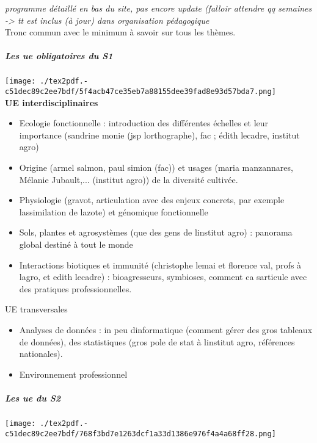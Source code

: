 \documentclass[
]{article}
\providecommand{\tightlist}{%
  \setlength{\itemsep}{0pt}\setlength{\parskip}{0pt}}
\begin{document}
\emph{programme détaillé en bas du site, pas encore update (falloir
attendre qq semaines -\textgreater{} tt est inclus (à jour) dans
organisation pédagogique}\\
Tronc commun avec le minimum à savoir sur tous les thèmes.

\hypertarget{les-ue-obligatoires-du-s1}{%
\subparagraph{Les ue obligatoires du
S1}\label{les-ue-obligatoires-du-s1}}

\texttt{[image: ./tex2pdf.-c51dec89c2ee7bdf/5f4acb47ce35eb7a88155dee39fad8e93d57bda7.png]}\\
\textbf{UE interdisciplinaires}

\begin{itemize}
\tightlist
\item
  Ecologie fonctionnelle : introduction des différentes échelles et leur
  importance (sandrine monie (jsp l\textquotesingle orthographe), fac ;
  édith lecadre, institut agro)
\item
  Origine (armel salmon, paul simion (fac)) et usages (maria
  manzannares, Mélanie Jubault,... (institut agro)) de la diversité
  cultivée.
\item
  Physiologie (gravot, articulation avec des enjeux concrets, par
  exemple l\textquotesingle assimilation de l\textquotesingle azote) et
  génomique fonctionnelle
\item
  Sols, plantes et agrosystèmes (que des gens de
  l\textquotesingle institut agro) : panorama global destiné à tout le
  monde
\item
  Interactions biotiques et immunité (christophe lemai et florence val,
  profs à l\textquotesingle agro, et edith lecadre) : bioagresseurs,
  symbioses, comment ca s\textquotesingle articule avec des pratiques
  professionnelles.
\end{itemize}

UE transversales

\begin{itemize}
\tightlist
\item
  Analyses de données : in peu d\textquotesingle informatique (comment
  gérer des gros tableaux de données), des statistiques (gros pole de
  stat à l\textquotesingle institut agro, références nationales).
\item
  Environnement professionnel
\end{itemize}

\hypertarget{les-ue-du-s2}{%
\subparagraph{Les ue du S2}\label{les-ue-du-s2}}

\texttt{[image: ./tex2pdf.-c51dec89c2ee7bdf/768f3bd7e1263dcf1a33d1386e976f4a4a68ff28.png]}
\end{document}
